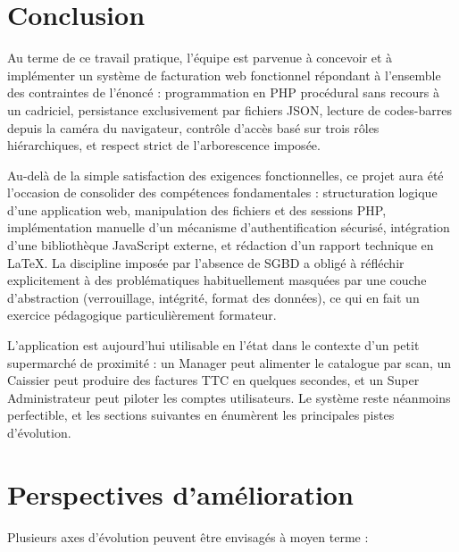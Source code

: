\documentclass[12pt,a4paper]{article}
\begin{document}
\section{Conclusion}
\label{sec:conclusion}

Au terme de ce travail pratique, l'équipe est parvenue à concevoir et à implémenter un système de facturation web fonctionnel répondant à l'ensemble des contraintes de l'énoncé : programmation en PHP procédural sans recours à un cadriciel, persistance exclusivement par fichiers JSON, lecture de codes-barres depuis la caméra du navigateur, contrôle d'accès basé sur trois rôles hiérarchiques, et respect strict de l'arborescence imposée.

Au-delà de la simple satisfaction des exigences fonctionnelles, ce projet aura été l'occasion de consolider des compétences fondamentales : structuration logique d'une application web, manipulation des fichiers et des sessions PHP, implémentation manuelle d'un mécanisme d'authentification sécurisé, intégration d'une bibliothèque JavaScript externe, et rédaction d'un rapport technique en \LaTeX{}. La discipline imposée par l'absence de SGBD a obligé à réfléchir explicitement à des problématiques habituellement masquées par une couche d'abstraction (verrouillage, intégrité, format des données), ce qui en fait un exercice pédagogique particulièrement formateur.

L'application est aujourd'hui utilisable en l'état dans le contexte d'un petit supermarché de proximité : un Manager peut alimenter le catalogue par scan, un Caissier peut produire des factures TTC en quelques secondes, et un Super Administrateur peut piloter les comptes utilisateurs. Le système reste néanmoins perfectible, et les sections suivantes en énumèrent les principales pistes d'évolution.

\section{Perspectives d'amélioration}

Plusieurs axes d'évolution peuvent être envisagés à moyen terme :
\end{document}
